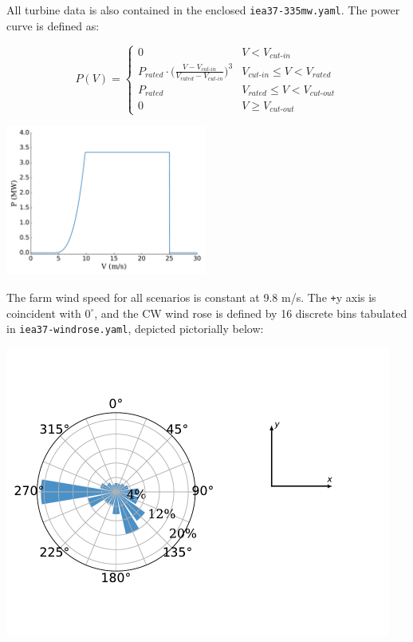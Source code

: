 \documentclass[10pt]{article}
\begin{document}
        \noindent All turbine data is also contained in the enclosed \texttt{iea37-335mw.yaml}. The power curve is defined as:   

        \begin{minipage}{0.53\textwidth}
            \begin{equation*}
                P(V) = 
                \begin{cases} 
                    0 & V < V_{\textit{cut-in}} \\
                    P_{\textit{rated}}\cdot\bigg(\frac{V-V_{\textit{cut-in}}}{V_{\textit{rated}}-V_{\textit{cut-in}}}\bigg)^3 & V_{\textit{cut-in}}\leq V < V_{\textit{rated}} \\
                    P_{\textit{rated}} & V_{\textit{rated}} \leq V < V_{\textit{cut-out}} \\
                    0 & V \geq V_{\textit{cut-out}}
                \end{cases}
            \label{eq:power}
            \end{equation*}
        \end{minipage}\quad
        \begin{minipage}{0.53\textwidth}
            \includegraphics[width=2.6in]{iea37-335mw-pcurve}
        \end{minipage}

        The farm wind speed for all scenarios is constant at 9.8 m/s. The \texttt{+}y axis is coincident with $0^{\circ}$, and the CW wind rose is defined by 16 discrete bins tabulated in \texttt{iea37-windrose.yaml}, depicted pictorially below:
       \vspace{-4.5em}
        \begin{center}
            \includegraphics[width=5in]{iea37-windrose-axis}
        \end{center}
        \vspace{-5em}
\end{document}
